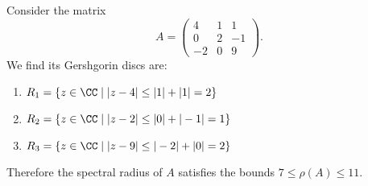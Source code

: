 \begin{example}
Consider the matrix
\begin{equation}
A = \begin{pmatrix}4 & 1 & 1\\
 0 & 2 & -1\\
-2 & 0 &  9
\end{pmatrix}.
\end{equation}
We find its Gershgorin discs are:
\begin{enumerate}
\item $R_{1} = \{z\in\CC\mid |z-4|\leq|1|+|1|=2\}$
\item $R_{2} = \{z\in\CC\mid |z-2|\leq|0|+|-1|=1\}$
\item $R_{3} = \{z\in\CC\mid |z-9|\leq|-2|+|0|=2\}$
\end{enumerate}
Therefore the spectral radius of $A$ satisfies the bounds $7\leq\rho(A)\leq11$.
\end{example}

